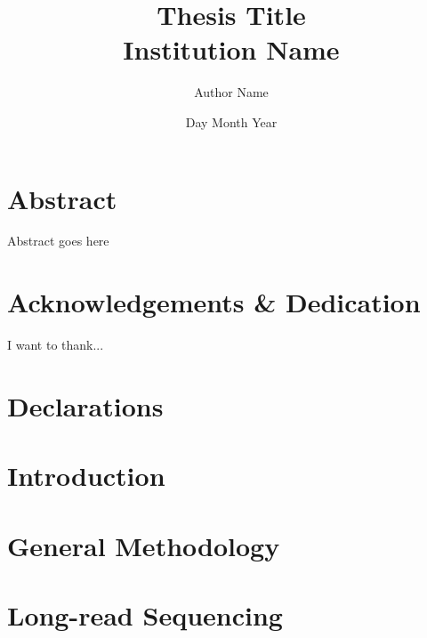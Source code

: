 \documentclass[a4paper,12pt,oneside]{report}
\begin{document}
\sloppy %
\title{
	{Thesis Title}\\
	{\large Institution Name}\\}
\author{Author Name}
\date{Day Month Year}

\normallinespacing
\maketitle
\pagestyle{plain} %

\chapter*{Abstract}
Abstract goes here

\chapter*{Acknowledgements \& Dedication}
I want to thank...

\newpage
\tableofcontents

\newpage
\listoffigures
{}

\newpage
\listoftables
{}

\newpage

\chapter*{Declarations}


\newpage
\renewcommand{\nomname}{Abbreviations}
\printnomenclature 

\chapter{Introduction}


\chapter{General Methodology}\label{ch: general methodology}


\chapter{Long-read Sequencing}\label{ch: long_read_sequencing}







\end{document}
